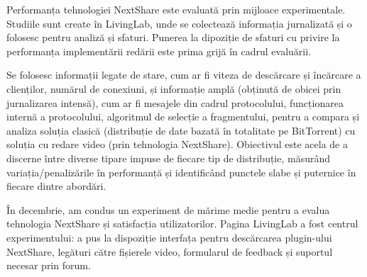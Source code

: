 Performanța tehnologiei NextShare este evaluată prin mijloace experimentale.
Studiile sunt create în LivingLab, unde se colectează informația jurnalizată și o
folosesc pentru analiză și sfaturi. Punerea la dipoziție de sfaturi cu privire
la performanța implementării redării este prima grijă în cadrul evaluării.

Se folosesc informații legate de stare, cum ar fi viteza de descărcare și
încărcare a clienților, numărul de conexiuni, și informație amplă
(obținută de obicei prin jurnalizarea intensă), cum ar fi mesajele din cadrul
protocolului, funcționarea internă a protocolului, algoritmul de selecție
a fragmentului, pentru a compara și analiza soluția clasică
(distribuție de date bazată în totalitate pe BitTorrent) cu soluția cu
redare video (prin tehnologia NextShare). Obiectivul este acela de a 
discerne între diverse tipare impuse de fiecare tip de distribuție,
măsurând variația/penalizările în performanță și identificând punctele
slabe și puternice în fiecare dintre abordări.

În decembrie, am condus un experiment de mărime medie pentru a evalua
tehnologia NextShare și satisfacția utilizatorilor. Pagina LivingLab a fost
centrul experimentului: a pus la dispoziție interfața pentru descărcarea
plugin-ului NextShare, legături către fișierele video, formularul de feedback
și suportul necesar prin forum.

